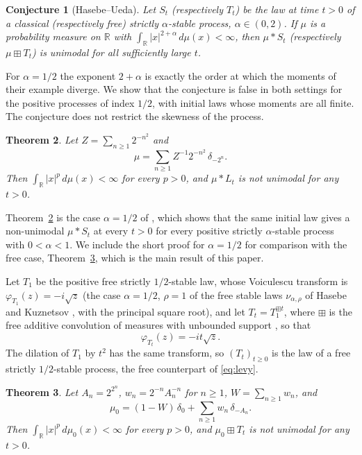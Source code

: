 \documentclass[11pt]{amsart}
\newtheorem{theorem}{Theorem}[section]
\newtheorem{conjecture}[theorem]{Conjecture}
\theoremstyle{definition}
\theoremstyle{remark}
\numberwithin{equation}{section}
\newcommand{\R}{\mathbb{R}}
\newcommand{\bp}{\boxplus}
\begin{document}
\begin{conjecture}[Hasebe--Ueda]\label{conj:HU}
Let $S_t$ (respectively $T_t$) be the law at time $t>0$ of a classical (respectively free) strictly $\alpha$-stable process, $\alpha\in(0,2)$. If $\mu$ is a probability measure on $\R$ with $\int_\R|x|^{2+\alpha}\,d\mu(x)<\infty$, then $\mu*S_t$ (respectively $\mu\bp T_t$) is unimodal for all sufficiently large $t$.
\end{conjecture}

For $\alpha=1/2$ the exponent $2+\alpha$ is exactly the order at which the moments of their example diverge. We show that the conjecture is false in both settings for the positive processes of index $1/2$, with initial laws whose moments are all finite. The conjecture does not restrict the skewness of the process.

\begin{theorem}\label{thm:classical}
Let $Z=\sum_{n\ge1}2^{-n^2}$ and
\[
\mu=\sum_{n\ge1}Z^{-1}2^{-n^2}\,\delta_{-2^n}.
\]
Then $\int_\R|x|^p\,d\mu(x)<\infty$ for every $p>0$, and $\mu*L_t$ is not unimodal for any $t>0$.
\end{theorem}

Theorem~\ref{thm:classical} is the case $\alpha=1/2$ of \cite[Corollary~1.3]{Sh26}, which shows that the same initial law gives a non-unimodal $\mu*S_t$ at every $t>0$ for every positive strictly $\alpha$-stable process with $0<\alpha<1$. We include the short proof for $\alpha=1/2$ for comparison with the free case, Theorem~\ref{thm:free}, which is the main result of this paper.

Let $T_1$ be the positive free strictly $1/2$-stable law, whose Voiculescu transform is $\varphi_{T_1}(z)=-i\sqrt z$ (the case $\alpha=1/2$, $\rho=1$ of the free stable laws $\nu_{\alpha,\rho}$ of Hasebe and Kuznetsov \cite{HK14}, with the principal square root), and let $T_t=T_1^{\bp t}$, where $\bp$ is the free additive convolution of measures with unbounded support \cite{BV93}, so that
\begin{equation}\label{eq:phiT}
\varphi_{T_t}(z)=-it\sqrt z .
\end{equation}
The dilation of $T_1$ by $t^2$ has the same transform, so $(T_t)_{t\ge0}$ is the law of a free strictly $1/2$-stable process, the free counterpart of \eqref{eq:levy}.

\begin{theorem}\label{thm:free}
Let $A_n=2^{2^n}$, $w_n=2^{-n}A_n^{-n}$ for $n\ge1$, $W=\sum_{n\ge1}w_n$, and
\[
\mu_0=(1-W)\,\delta_0+\sum_{n\ge1}w_n\,\delta_{-A_n}.
\]
Then $\int_\R|x|^p\,d\mu_0(x)<\infty$ for every $p>0$, and $\mu_0\bp T_t$ is not unimodal for any $t>0$.
\end{theorem}
\end{document}
